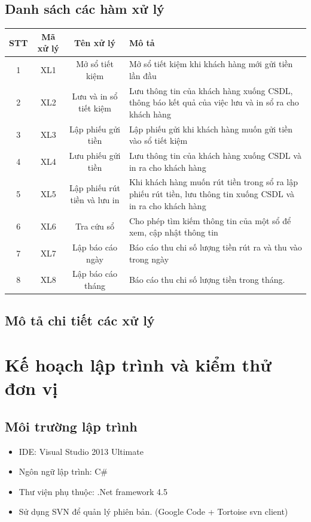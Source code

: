 \documentclass{article}
\begin{document}
		\subsection{Danh sách các hàm xử lý}
		
			\begin{tabular}{|c|c|c|p{4.5cm}|}
				\hline
				STT & Mã xử lý & Tên xử lý & Mô tả\\
				\hline
				1 & XL1 & Mở sổ tiết kiệm & Mở sổ tiết kiệm khi khách hàng mới gửi tiền lần đầu\\
				\hline
				2 & XL2 & Lưu và in sổ tiết kiệm & Lưu thông tin của khách hàng xuống CSDL, thông báo kết quả của việc lưu và in sổ ra cho khách hàng\\
				\hline
				3 & XL3 & Lập phiếu gửi tiền & Lập phiếu gửi khi khách hàng muốn gửi tiền vào sổ tiết kiệm\\
				\hline
				4 & XL4 & Lưu phiếu gửi tiền & Lưu thông tin của khách hàng xuống CSDL và in ra cho khách hàng\\
				\hline
				5 & XL5 & Lập phiếu rút tiền và lưu in & Khi khách hàng muốn rút tiền trong sổ ra lập phiếu rút tiền, lưu thông tin xuống CSDL và in ra cho khách hàng\\
				\hline
				6 & XL6 & Tra cứu sổ & Cho phép tìm kiếm thông tin của một sổ để xem, cập nhật thông tin\\
				\hline
				7 & XL7 & Lập báo cáo ngày & Báo cáo thu chi số lượng tiền rút ra và thu vào trong ngày\\
				\hline
				8 & XL8 & Lập báo cáo tháng & Báo cáo thu chi số lượng tiền trong tháng.\\
				\hline
			\end{tabular}
		
		\subsection{Mô tả chi tiết các xử lý}
	
		\section{Kế hoạch lập trình và kiểm thử đơn vị}
			\subsection{Môi trường lập trình}
				\begin{itemize}
					\item IDE: Visual Studio 2013 Ultimate
					\item Ngôn ngữ lập trình: C\#
					\item Thư viện phụ thuộc: .Net framework 4.5
					\item Sử dụng SVN để quản lý phiên bản. (Google Code + Tortoise svn client)
				\end{itemize}
				
\end{document}
